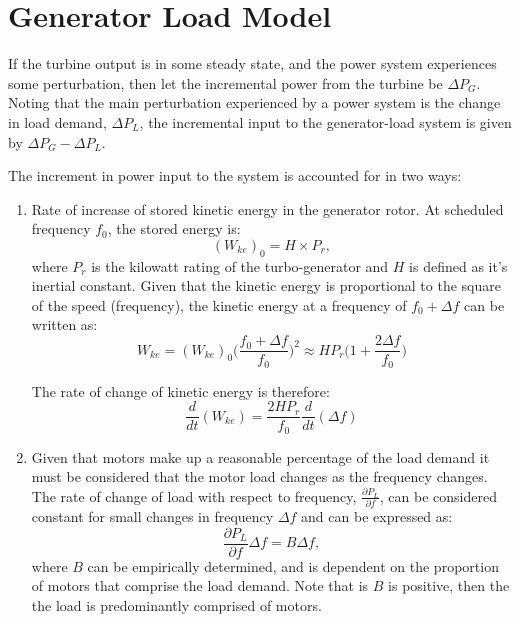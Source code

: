 \section{Generator Load Model}
If the turbine output is in some steady state, and the power system experiences some perturbation, then let the incremental power from the turbine be $\Delta P_G$. Noting that the main perturbation experienced by a power system is the change in load demand, $\Delta P_L$, the incremental input to the generator-load system is given by $\Delta P_G - \Delta P_L$.

The increment in power input to the system is accounted for in two ways:
\begin{enumerate}
	
	\item Rate of increase of stored kinetic energy in the generator rotor. At scheduled frequency $f_0$, the stored energy is:
	\begin{equation}
		(W_{ke})_0 = H \times P_r,
	\end{equation}
	where $P_r$ is the kilowatt rating of the turbo-generator and $H$ is defined as it's inertial constant. Given that the kinetic energy is proportional to the square of the speed (frequency), the kinetic energy at a frequency of $f_0 + \Delta f$ can be written as:
	\begin{equation}
		W_{ke} = (W_{ke})_0 \bigg( \frac{f_0 + \Delta f}{f_0} \bigg)^2 \approx H P_r \bigg( 1 + \frac{2\Delta f}{f_0} \bigg)
	\end{equation}
	
	The rate of change of kinetic energy is therefore:
	\begin{equation}
		\frac{d}{dt}(W_{ke}) = \frac{2 H P_r}{f_0} \frac{d}{dt} (\Delta f) \label{eq:A11}
	\end{equation}
	
	\item Given that motors make up a reasonable percentage of the load demand it must be considered that the motor load changes as the frequency changes. The rate of change of load with respect to frequency, $\frac{\partial P_L}{\partial f}$, can be considered constant for small changes in frequency $\Delta f$ and can be expressed as:
	\begin{equation}
		\frac{\partial P_L}{\partial f} \Delta f = B \Delta f \label{eq:A12},
	\end{equation}
	where $B$ can be empirically determined, and is dependent on the proportion of motors that comprise the load demand. Note that is $B$ is positive, then the the load is predominantly comprised of motors.
\end{enumerate}

